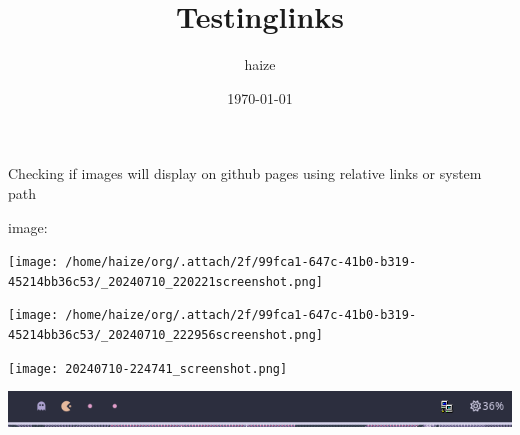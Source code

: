 \documentclass[11pt]{article}
\author{haize}
\date{\today}
\title{Testinglinks}
\begin{document}
\maketitle
\tableofcontents

Checking if images will display on github pages using relative links or system path

image:


\begin{center}
\texttt{[image: /home/haize/org/.attach/2f/99fca1-647c-41b0-b319-45214bb36c53/\_20240710\_220221screenshot.png]}
\end{center}

\begin{center}
\texttt{[image: /home/haize/org/.attach/2f/99fca1-647c-41b0-b319-45214bb36c53/\_20240710\_222956screenshot.png]}
\end{center}




\begin{center}
\texttt{[image: 20240710-224741\_screenshot.png]}
\end{center}

\begin{center}
\includegraphics[width=.9\linewidth]{./images/20240710-224823_screenshot.png}
\end{center}
\end{document}
